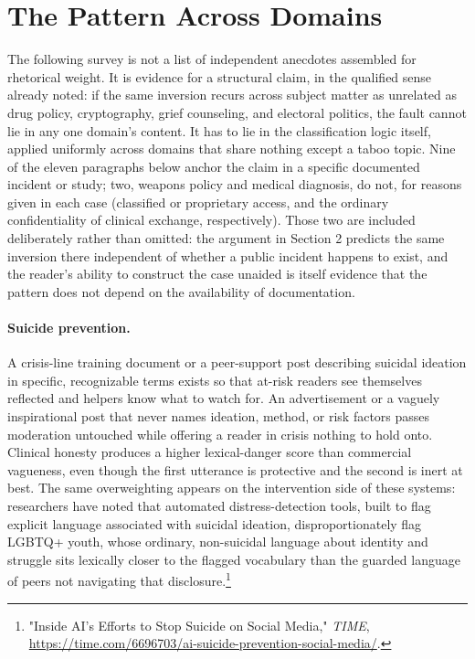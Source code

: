 \documentclass[11pt]{article}
\begin{document}
\section{The Pattern Across Domains}

The following survey is not a list of independent anecdotes assembled for rhetorical weight. It is evidence for a structural claim, in the qualified sense already noted: if the same inversion recurs across subject matter as unrelated as drug policy, cryptography, grief counseling, and electoral politics, the fault cannot lie in any one domain's content. It has to lie in the classification logic itself, applied uniformly across domains that share nothing except a taboo topic. Nine of the eleven paragraphs below anchor the claim in a specific documented incident or study; two, weapons policy and medical diagnosis, do not, for reasons given in each case (classified or proprietary access, and the ordinary confidentiality of clinical exchange, respectively). Those two are included deliberately rather than omitted: the argument in Section 2 predicts the same inversion there independent of whether a public incident happens to exist, and the reader's ability to construct the case unaided is itself evidence that the pattern does not depend on the availability of documentation.

\paragraph{Suicide prevention.} A crisis-line training document or a peer-support post describing suicidal ideation in specific, recognizable terms exists so that at-risk readers see themselves reflected and helpers know what to watch for. An advertisement or a vaguely inspirational post that never names ideation, method, or risk factors passes moderation untouched while offering a reader in crisis nothing to hold onto. Clinical honesty produces a higher lexical-danger score than commercial vagueness, even though the first utterance is protective and the second is inert at best. The same overweighting appears on the intervention side of these systems: researchers have noted that automated distress-detection tools, built to flag explicit language associated with suicidal ideation, disproportionately flag LGBTQ+ youth, whose ordinary, non-suicidal language about identity and struggle sits lexically closer to the flagged vocabulary than the guarded language of peers not navigating that disclosure.\footnote{"Inside AI's Efforts to Stop Suicide on Social Media," \emph{TIME}, \url{https://time.com/6696703/ai-suicide-prevention-social-media/}.}
\end{document}
